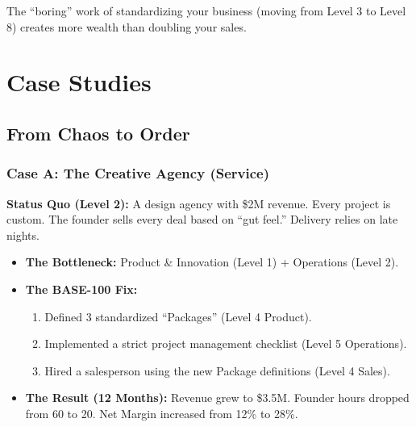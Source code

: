 \documentclass[11pt, a4paper, oneside]{report}
\begin{document}
The ``boring'' work of standardizing your business (moving from Level 3 to Level 8) creates more wealth than doubling your sales.

\chapter{Case Studies}
\section*{From Chaos to Order}

\subsection*{Case A: The Creative Agency (Service)}
\textbf{Status Quo (Level 2):} A design agency with \$2M revenue. Every project is custom. The founder sells every deal based on ``gut feel.'' Delivery relies on late nights.
\begin{itemize}
    \item \textbf{The Bottleneck:} Product \& Innovation (Level 1) + Operations (Level 2).
    \item \textbf{The BASE-100 Fix:}
    \begin{enumerate}
        \item Defined 3 standardized ``Packages'' (Level 4 Product).
        \item Implemented a strict project management checklist (Level 5 Operations).
        \item Hired a salesperson using the new Package definitions (Level 4 Sales).
    \end{enumerate}
    \item \textbf{The Result (12 Months):} Revenue grew to \$3.5M. Founder hours dropped from 60 to 20. Net Margin increased from 12\% to 28\%.
\end{itemize}
\end{document}
